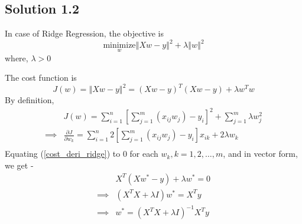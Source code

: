 \subsection*{Solution 1.2}
In case of Ridge Regression, the objective is
\begin{equation}
	\underset{w}{\text{minimize}}\left\Vert Xw-y \right\Vert^2 + \lambda\left\Vert w \right\Vert^2
\end{equation}
where, $\lambda > 0$
\par
The cost function is
\begin{equation}
\label{cost_func_ridge}
	J(w) = \left\Vert Xw-y \right\Vert^2 = (Xw -y)^T(Xw -y) + \lambda w^Tw
\end{equation}
By definition,
\begin{equation}
\label{cost_deri_ridge}
	\begin{split}
					& J(w) = \sum_{i=1}^{n}\left[ \sum_{j=1}^{m}(x_{ij}w_j)-y_i \right]^2 + \sum_{j=1}^{m}\lambda w_j^2\\
		\implies 	& \frac{\partial J}{\partial w_k} = \sum_{i=1}^{n} 2 \left[ \sum_{j=1}^{m}(x_{ij}w_j)-y_i \right]x_{ik} + 2\lambda w_k\\
	\end{split}
\end{equation}
Equating (\ref{cost_deri_ridge}) to $0$ for each $w_k, k=1,2,\dots, m$, and in vector form, we get - 
\begin{equation}
	\begin{split}
					& X^T(Xw^* - y) + \lambda w^* = 0\\
		\implies	& (X^TX + \lambda I)w^* = X^Ty\\
		\implies	& w^* = (X^TX + \lambda I)^{-1}X^Ty\\
	\end{split}
\end{equation}